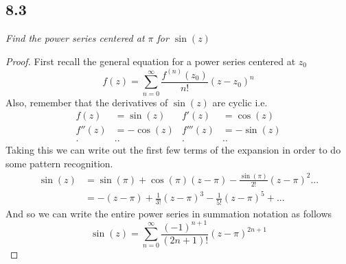 \documentclass[a4paper, 11pt]{article}
\begin{document}
\subsection*{8.3}
	\textit{Find the power series centered at $\pi$ for $\sin(z)$}
	\begin{proof}
		First recall the general equation for a power series centered at $z_0$
			\begin{equation*}
				f(z) = \sum\limits_{n=0}^{\infty}\frac{f^{(n)}(z_0)}{n!}(z-z_0)^n
			\end{equation*}
		\noindent Also, remember that the derivatives of $\sin(z)$ are cyclic i.e. 
			\begin{align*}
				f(z) &= \sin(z) & f'(z) &= \cos(z) \\ 
				f''(z) &= -\cos(z) & f'''(z) &= -\sin(z) \\ 
				. & .. & . &.. 
			\end{align*}
		\noindent Taking this we can write out the first few terms of the expansion in order to do some pattern recognition. 
			\begin{align*}
				\sin(z) &= \sin(\pi) + \cos(\pi)(z-\pi) -\frac{\sin(\pi)}{2!}(z-\pi)^2 ... \\
				&= - (z-\pi)+\frac{1}{3!}(z-\pi)^3-\frac{1}{5!}(z-\pi)^5 + ...
			\end{align*}
		And so we can write the entire power series in summation notation as follows 
			\begin{equation*}
				\sin(z) = \sum_{n=0}^{\infty}\frac{(-1)^{n+1}}{(2n+1)!}(z-\pi)^{2n+1}
			\end{equation*}
	\end{proof}
	
	
	
	
\end{document}
